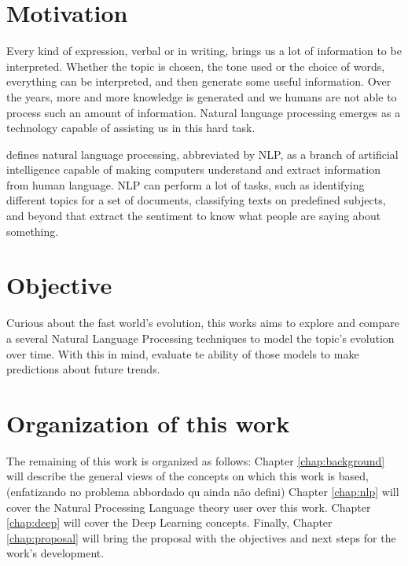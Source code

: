 \section{Motivation}

Every kind of expression, verbal or in writing, brings us a lot of information to be interpreted. Whether the topic is chosen, the tone used or the choice of words, everything can be interpreted, and then generate some useful information. Over the years, more and more knowledge is generated and we humans are not able to process such an amount of information. Natural language processing emerges as a technology capable of assisting us in this hard task.

\cite{state_of_the_art} defines natural language processing, abbreviated by NLP, as a branch of artificial intelligence capable of making computers understand and extract information from human language. NLP can perform a lot of tasks, such as identifying different topics for a set of documents, classifying texts on predefined subjects, and beyond that extract the sentiment to know what people are saying about something.

%

\section{Objective}

Curious about the fast world's evolution, this works aims to explore and compare a several Natural Language Processing techniques to model the topic's evolution over time. With this in mind, evaluate te ability of those models to make predictions about future trends.


\section{Organization of this work}

The remaining of this work is organized as follows: Chapter \ref{chap:background} will describe the general views of the concepts on which this work is based, (enfatizando no problema abbordado qu ainda não defini) 
Chapter \ref{chap:nlp} will cover the Natural Processing Language theory user over this work. Chapter \ref{chap:deep} will cover the Deep Learning concepts. 
Finally, Chapter \ref{chap:proposal} will bring the proposal with the objectives and next steps for the work's development.
